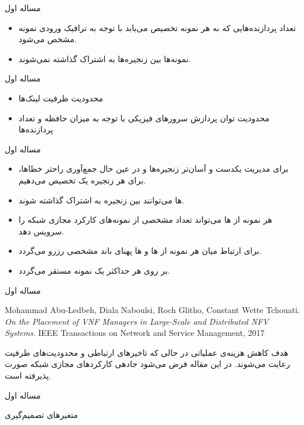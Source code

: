 \documentclass{beamer}
\makeatletter
\newcommand{\RTList}{\raggedleft\rightskip\@totalleftmargin}
\makeatother
\begin{document}
\begin{persian}
\begin{frame}{مساله اول}
\begin{itemize}
		\item تعداد پردازنده‌هایی که به هر نمونه تخصیص می‌یابد با توجه به ترافیک ورودی نمونه مشخص می‌شود.
		\item نمونه‌ها بین زنجیره‌ها به اشتراک گذاشته نمی‌شوند.
	\end{itemize}
\end{frame}
\begin{frame}{مساله اول}
	\begin{itemize}\RTList{}
		\item محدودیت ظرفیت لینک‌ها
		\item محدودیت توان پردازش سرورهای فیزیکی با توجه به میزان حافظه و تعداد پردازنده‌ها
	\end{itemize}
\end{frame}
\begin{frame}{مساله اول}
	\begin{itemize}\RTList{}
    	\item برای مدیریت یکدست و آسان‌تر زنجیره‌ها و در عین حال جمع‌آوری راحتر خطاها، برای هر زنجیره یک  تخصیص می‌دهیم.
		\item {}ها می‌توانند بین زنجیره به اشتراک گذاشته شوند.
		\item هر نمونه از ها می‌تواند تعداد مشخصی از نمونه‌های کارکرد مجازی شبکه را سرویس دهد. 
		\item برای ارتباط میان هر نمونه از ها و ها پهنای باند مشخصی رزرو می‌گردد.
		\item بر روی هر  حداکثر یک نمونه  مستقر می‌گردد.
	\end{itemize}
\end{frame}
\begin{frame}{مساله اول}
	\begin{latin}\begin{thebibliography}{9}
		Mohammad Abu-Ledbeh, Diala Naboulsi, Roch Glitho, Constant Wette Tchouati.
		\textit{On the Placement of VNF Managers in Large-Scale and Distributed NFV Systems}. 
		IEEE Transactions on Network and Service Management, 2017
	\end{thebibliography}\end{latin}
	\par
	هدف کاهش هزینه‌ی عملیاتی در حالی که تاخیرهای ارتباطی و محدودیت‌های ظرفیت رعایت می‌شوند.
	در این مقاله فرض می‌شود جادهی کارکردهای مجازی شبکه صورت پذیرفته است.
\end{frame}
\begin{frame}{مساله اول}
	\par
	متغیرهای تصمیم‌گیری

\end{frame}
\end{persian}
\end{document}
